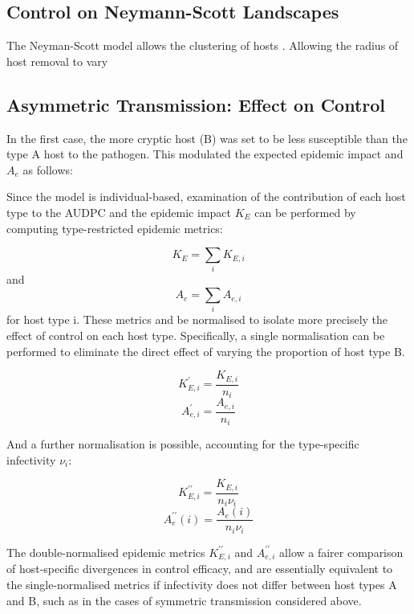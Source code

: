 \documentclass[prstpaper]{revtex4-2}
\begin{document}
\subsection{Control on Neymann-Scott Landscapes}

The Neyman-Scott model allows the clustering of hosts \cite{Oikos paper}. Allowing the radius of host removal to vary 

\subsection{Asymmetric Transmission: Effect on Control}

In the first case, the more cryptic host (B) was set to be less susceptible than the type A host to the pathogen. This modulated the expected epidemic impact and $A_{e}$ as follows: 

Since the model is individual-based, examination of the contribution of each host type to the AUDPC and the epidemic impact $K_E$ can be performed by computing type-restricted epidemic metrics:

\begin{equation}
    K_E = \sum_{i} K_{E, i}
\end{equation}
and 
\begin{equation}
A_e = \sum_{i} A_{e,i}
\end{equation}
for host type i. These metrics and be normalised to isolate more precisely the effect of control on each host type. Specifically, a single normalisation can be performed to eliminate the direct effect of varying the proportion of host type B.

\begin{equation}
    {K^\prime_{E, i}} = \frac{K_{E, i}}{n_i}
\end{equation}
\begin{equation}
    {A_{e,i} ^\prime} = \frac{A_{e,i}}{n_i}
\end{equation}

And a further normalisation is possible, accounting for the type-specific infectivity $\nu_{i}$:

\begin{equation}
        K ^{\prime\prime} _{E, i} = \frac{K_{E, i}}{n_{i} \nu_{i}}
\end{equation}
\begin{equation}
        {{A_e ^{\prime\prime}(i)}} = \frac{A_e(i)}{n_i \nu_{i}}
\end{equation}

The double-normalised epidemic metrics $K^{\prime\prime}_{E,i}$ and $A^{\prime\prime}_{e,i}$ allow a fairer comparison of host-specific divergences in control efficacy, and are essentially equivalent to the single-normalised metrics if infectivity does not differ between host types A and B, such as in the cases of symmetric transmission considered above. 
\end{document}

